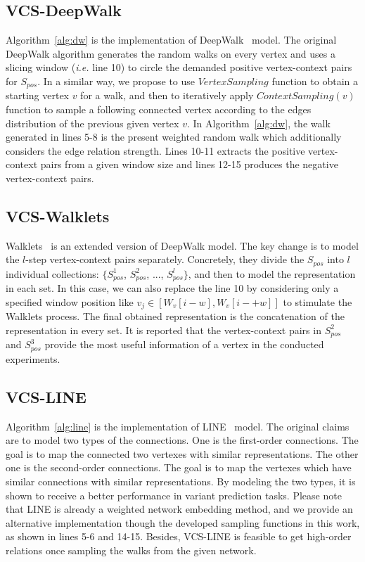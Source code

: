 \subsection{VCS-DeepWalk}

Algorithm~\ref{alg:dw} is the implementation of DeepWalk~\cite{dw} model. The original DeepWalk algorithm generates the random walks on every vertex and uses a slicing window (\textit{i.e.} line 10) to circle the demanded positive vertex-context pairs for $S_{pos}$.  In a similar way, we propose to use $VertexSampling$ function to obtain a starting vertex $v$ for a walk, and then to iteratively apply $ContextSampling(v)$ function to sample a following connected vertex according to the edges distribution of the previous given vertex $v$. In Algorithm~\ref{alg:dw}, the walk generated in lines 5-8 is the present weighted random walk which additionally considers the edge relation strength. Lines 10-11 extracts the positive vertex-context pairs from a given window size and lines 12-15 produces the negative vertex-context pairs.

\subsection{VCS-Walklets}

Walklets~\cite{wl} is an extended version of DeepWalk model.  The key change is to model the $l$-step vertex-context pairs separately.  Concretely, they divide the $S_{pos}$ into $l$ individual collections: $\{S_{pos}^{1}$, $S_{pos}^{2}$, ..., $S_{pos}^{l}\}$, and then to model the representation in each set.  In this case, we can also replace the line 10 by considering only a specified window position like $v_{j} \in [W_{v}[i-w],W_{v}[i-+w]]$ to stimulate the Walklets process.  The final obtained representation is the concatenation of the representation in every set.  It is reported that the vertex-context pairs in $S_{pos}^{2}$ and $S_{pos}^{3}$ provide the most useful information of a vertex in the conducted experiments.

\subsection{VCS-LINE}

Algorithm~\ref{alg:line} is the implementation of LINE~\cite{line} model.  The original claims are to model two types of the connections. One is the first-order connections.  The goal is to map the connected two vertexes with similar representations. The other one is the second-order connections.  The goal is to map the vertexes which have similar connections with similar representations. By modeling the two types, it is shown to receive a better performance in variant prediction tasks.  Please note that LINE is already a weighted network embedding method, and we provide an alternative implementation though the developed sampling functions in this work, as shown in lines 5-6 and 14-15. Besides, VCS-LINE is feasible to get high-order relations once sampling the walks from the given network.


